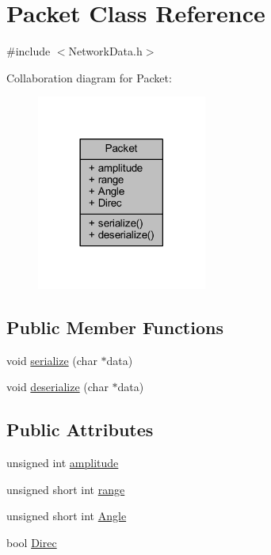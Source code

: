 \hypertarget{class_packet}{}\section{Packet Class Reference}
\label{class_packet}


{\ttfamily \#include $<$Network\+Data.\+h$>$}



Collaboration diagram for Packet\+:
\nopagebreak
\begin{figure}[H]
\begin{center}
\leavevmode
\includegraphics[width=158pt]{class_packet__coll__graph}
\end{center}
\end{figure}
\subsection*{Public Member Functions}
\begin{DoxyCompactItemize}
\item 
void \mbox{\hyperlink{class_packet_a70dba5b27e4b75e68a5b3c36879f62c5}{serialize}} (char $\ast$data)
\item 
void \mbox{\hyperlink{class_packet_a2eee3a176f3b4255a615c5ce01fc9fc3}{deserialize}} (char $\ast$data)
\end{DoxyCompactItemize}
\subsection*{Public Attributes}
\begin{DoxyCompactItemize}
\item 
unsigned int \mbox{\hyperlink{class_packet_a720bab862cb03f6806b055c8a827b98a}{amplitude}}
\item 
unsigned short int \mbox{\hyperlink{class_packet_a86258b3278224f74c1df87ec4e93df7a}{range}}
\item 
unsigned short int \mbox{\hyperlink{class_packet_ad962f4d6fa0f2b603c1e0b3c6b99542b}{Angle}}
\item 
bool \mbox{\hyperlink{class_packet_a4c52a8445a13d9f17ecec54edc8988ca}{Direc}}
\end{DoxyCompactItemize}


